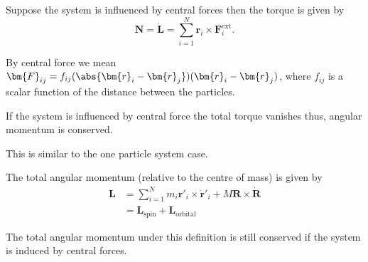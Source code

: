 \documentclass[12pt, a4paper]{article}
\begin{document}
\begin{mdthm}
    Suppose the system is influenced by central forces then the torque is given by 
    \[\bm{N}=\dot{\bm{L}}=\sum_{i=1}^N\bm{r}_i \times  \bm{F}_i^{\text{ext}}.\]
\end{mdthm}

\begin{mdremark}
    By central force we mean \(\bm{F}_{ij} =f_{ij}(\abs{\bm{r}_i-\bm{r}_j})(\bm{r}_i-\bm{r}_j)\), where \(f_{ij}\) is a scalar function of the distance between the particles.
\end{mdremark}

\begin{mdcor}
    If the system is influenced by central force the total torque vanishes thus, angular momentum is conserved.
\end{mdcor}

\begin{mdnote}
    This is similar to the one particle system case.
\end{mdnote}

\begin{mdthm}
    The total angular momentum (relative to the centre of mass) is given by
    \[\begin{aligned}
        \bm{L}&=\sum_{i=1}^N m_i \bm{r}'_i \times \dot{\bm{r}}'_i + M \bm{R}\times \dot{\bm{R}} \\ 
        &= \bm{L}_{\text{spin}} + \bm{L}_{\text{orbital}}
    \end{aligned}\]
\end{mdthm}

\begin{mdremark}
    The total angular momentum under this definition is still conserved if the system is induced by central forces.
\end{mdremark}
\end{document}
